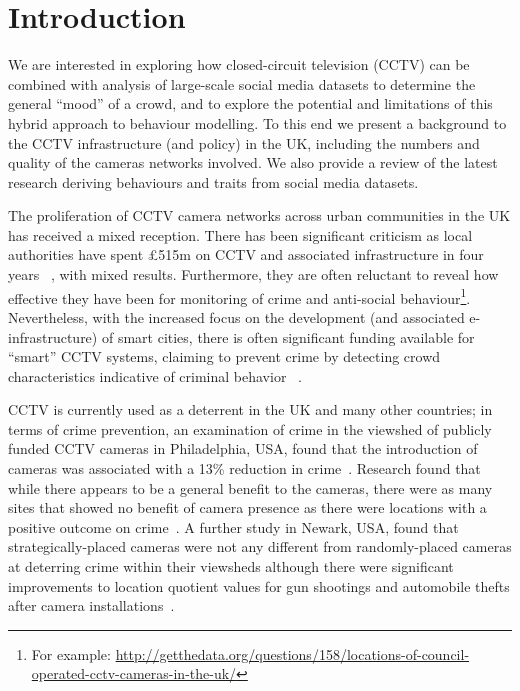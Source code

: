 \documentclass[conference]{IEEEtran}
\begin{document}
\section{Introduction}

We are interested in exploring how closed-circuit television (CCTV)
can be combined with analysis of large-scale social media datasets to
determine the general ``mood'' of a crowd, and to explore the
potential and limitations of this hybrid approach to behaviour
modelling. To this end we present a background to the CCTV
infrastructure (and policy) in the UK, including the numbers and
quality of the cameras networks involved. We also provide a review of
the latest research deriving behaviours and traits from social media
datasets.

The proliferation of CCTV camera networks across urban communities in
the UK has received a mixed reception. There has been significant
criticism as local authorities have spent \pounds515m on CCTV and
associated infrastructure in four years ~\cite{bbw:2012}, with mixed
results. Furthermore, they are often reluctant to reveal how effective
they have been for monitoring of crime and anti-social
behaviour\footnote{For example:
\url{http://getthedata.org/questions/158/locations-of-council-operated-cctv-cameras-in-the-uk/}}.
Nevertheless, with the increased focus on the development (and
associated e-infrastructure) of smart cities, there is often
significant funding available for ``smart'' CCTV systems, claiming to
prevent crime by detecting crowd characteristics indicative of
criminal behavior ~\cite{welsh+farrington:2009,dibella-et-al:2014}.

CCTV is currently used as a deterrent in the UK and many other
countries; in terms of crime prevention, an examination of crime in
the viewshed of publicly funded CCTV cameras in Philadelphia, USA,
found that the introduction of cameras was associated with a 13\%
reduction in crime~\cite{ratcliffe+taniguchi:2008}. Research found
that while there appears to be a general benefit to the cameras, there
were as many sites that showed no benefit of camera presence as there
were locations with a positive outcome on
crime~\cite{ratcliffe-et-al:2009}.  A further study in Newark, USA,
found that strategically-placed cameras were not any different from
randomly-placed cameras at deterring crime within their viewsheds
although there were significant improvements to location quotient
values for gun shootings and automobile thefts after camera
installations~\cite{caplan-et-al:2011}.
\end{document}
